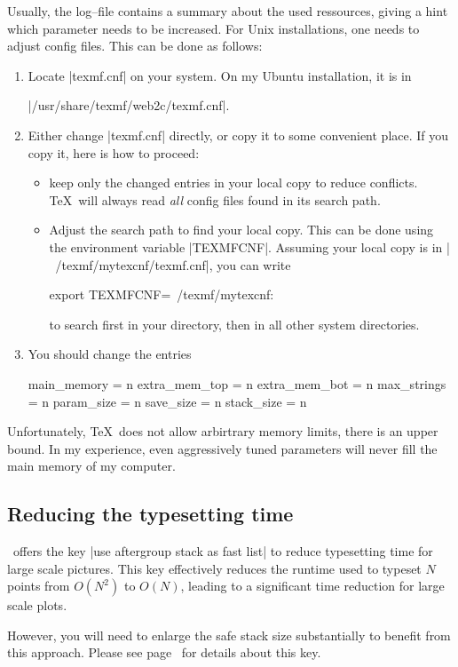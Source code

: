 Usually, the log--file contains a summary about the used ressources, giving a hint which parameter needs to be increased. For Unix installations, one needs to adjust config files. This can be done as follows:
\begin{enumerate}
	\item Locate |texmf.cnf| on your system. On my Ubuntu installation, it is in 
	
	|/usr/share/texmf/web2c/texmf.cnf|.
	\item Either change |texmf.cnf| directly, or copy it to some convenient place. If you copy it, here is how to proceed:
		\begin{itemize}
			\item keep only the changed entries in your local copy to reduce conflicts. \TeX\ will always read \emph{all} config files found in its search path.
			\item Adjust the search path to find your local copy. This can be done using the environment variable |TEXMFCNF|. Assuming your local copy is in |~/texmf/mytexcnf/texmf.cnf|, you can write
\begin{codeexample}
export TEXMFCNF=~/texmf/mytexcnf:
\end{codeexample}
			to search first in your directory, then in all other system directories.
		\end{itemize}
	\item You should change the entries
\begin{codeexample}
main_memory = n
extra_mem_top = n
extra_mem_bot = n
max_strings = n
param_size = n
save_size = n
stack_size = n
\end{codeexample}
\end{enumerate}
Unfortunately, \TeX\ does not allow arbirtrary memory limits, there is an upper bound. In my experience, even aggressively tuned parameters will never fill the main memory of my computer.


\subsection{Reducing the typesetting time}
\PGFPlots\ offers the key |use aftergroup stack as fast list| to reduce typesetting time for large scale pictures. This key effectively reduces the runtime used to typeset $N$ points from $O(N^2)$ to $O(N)$, leading to a significant time reduction for large scale plots.

However, you will need to enlarge the safe stack size substantially to benefit from this approach. Please see page~\pageref{page:aftergroupstack:as:list} for details about this key.
